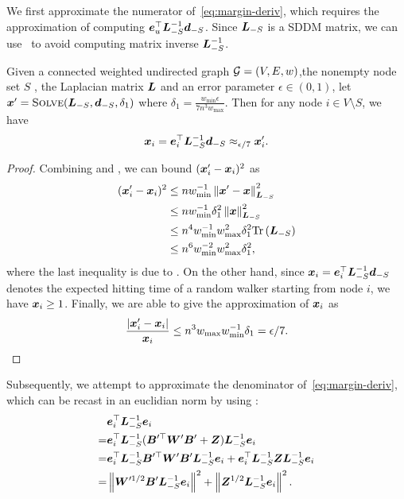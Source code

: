 \documentclass[sigconf]{acmart}
\begin{document}
We first approximate the numerator of~\eqref{eq:margin-deriv}, which requires the approximation of computing \(\boldsymbol{e}_u^\top\boldsymbol{L}_{-S}^{-1}\boldsymbol{d}_{-S}\).
Since \(\boldsymbol{L}_{-S}\) is a SDDM matrix, we can use~ to avoid computing matrix inverse \(\boldsymbol{L}_{-S}^{-1}\).
\begin{lemma}\label{lem:approx-numer}
  Given a connected weighted undirected graph \(\mathcal{G}=(V,E,w)\),the nonempty node set \(S\) , the Laplacian matrix \(\boldsymbol{L}\) and an error parameter \(\epsilon\in(0,1)\), let \(\boldsymbol{x}'=\textsc{Solve}(\boldsymbol{L}_{-S},\boldsymbol{d}_{-S},\delta_1)\) where \(\delta_1=\frac{w_{\min}\epsilon}{7n^3w_{\max}}\). Then for any node \(i\in V\setminus S\), we have
  \begin{equation}\label{eq:approx-numer}
    \boldsymbol{x}_i=\boldsymbol{e}_i^\top\boldsymbol{L}_{-S}^{-1}\boldsymbol{d}_{-S}\approx_{\epsilon/7}\boldsymbol{x}'_i.
  \end{equation}
\end{lemma}
\begin{proof}

  Combining  and , we can bound \((\boldsymbol{x}'_i-\boldsymbol{x}_i)^2\) as
  \begin{align*}
    (\boldsymbol{x}'_i-\boldsymbol{x}_i)^2
     & \le nw_{\min}^{-1}\left\Vert\boldsymbol{x}'-\boldsymbol{x}\right\Vert^2_{\boldsymbol{L}_{-S}}        \\
     & \le nw_{\min}^{-1}\delta_1^2\left\Vert\boldsymbol{x}\right\Vert^2_{\boldsymbol{L}_{-S}}     \\
     & \le n^4w_{\min}^{-1}w_{\max}^2\delta_1^2\mathrm{Tr}\left(\boldsymbol{L}_{-S}\right) \\
     & \le n^6w_{\min}^{-2}w_{\max}^2\delta_1^2,
  \end{align*}
  where the last inequality is due to .
  On the other hand, since \(\boldsymbol{x}_i=\boldsymbol{e}_i^\top\boldsymbol{L}_{-S}^{-1}\boldsymbol{d}_{-S}\) denotes the expected hitting time of a random walker starting from node \(i\), we have \(\boldsymbol{x}_i\ge1\).
  Finally, we are able to give the approximation of \(\boldsymbol{x}_i\) as
  \[\frac{\left|\boldsymbol{x}'_i-\boldsymbol{x}_i \right|}{\boldsymbol{x}_i}\le n^3w_{\max}w_{\min}^{-1}\delta_1=\epsilon/7.\]
\end{proof}

Subsequently, we attempt to approximate the denominator of~\eqref{eq:margin-deriv}, which can be recast in an euclidian norm by using :
\begin{equation}\label{eq:denom-solver}
  \begin{split}
    &\boldsymbol{e}_i^\top\boldsymbol{L}_{-S}^{-1}\boldsymbol{e}_i\\
    =&\boldsymbol{e}_i^\top\boldsymbol{L}_{-S}^{-1}(\boldsymbol{B}'^\top\boldsymbol{W}'\boldsymbol{B}'+\boldsymbol{Z})\boldsymbol{L}_{-S}^{-1}\boldsymbol{e}_i\\
    =&\boldsymbol{e}_i^\top\boldsymbol{L}_{-S}^{-1}\boldsymbol{B}'^\top\boldsymbol{W}'\boldsymbol{B}'\boldsymbol{L}_{-S}^{-1}\boldsymbol{e}_i+\boldsymbol{e}_i^\top\boldsymbol{L}_{-S}^{-1}\boldsymbol{Z}\boldsymbol{L}_{-S}^{-1}\boldsymbol{e}_i\\
    =&\left\Vert\boldsymbol{W}'^{1/2}\boldsymbol{B}'\boldsymbol{L}_{-S}^{-1}\boldsymbol{e}_i\right\Vert^2+\left\Vert\boldsymbol{Z}^{1/2}\boldsymbol{L}_{-S}^{-1}\boldsymbol{e}_i\right\Vert^2.
  \end{split}
\end{equation}
\end{document}
